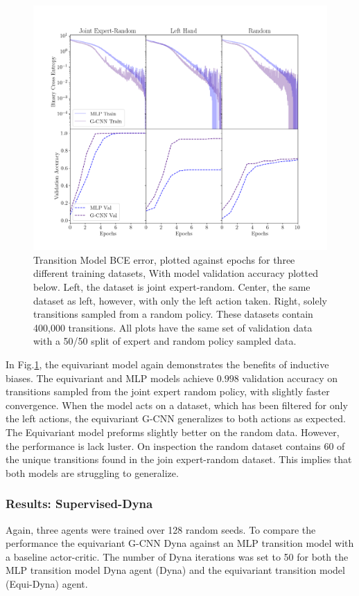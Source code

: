 \begin{figure}
	\centering
	\includegraphics[width=\linewidth]{Figures/transition_model_catch.png}
	\caption{Transition Model BCE error, plotted against epochs for three different training datasets, With model validation accuracy plotted below. Left, the dataset is joint expert-random. Center, the same dataset as left, however, with only the left action taken. Right, solely transitions sampled from a random policy. These datasets contain 400,000 transitions. All plots have the same set of validation data with a 50/50 split of expert and random policy sampled data.}
	\label{fig:tm_catch}
\end{figure}

In Fig.\ref{fig:tm_catch}, the equivariant model again demonstrates the benefits of inductive biases. The equivariant and MLP models achieve $0.998$ validation accuracy on transitions sampled from the joint expert random policy, with slightly faster convergence. When the model acts on a dataset, which has been filtered for only the left actions, the equivariant G-CNN generalizes to both actions as expected. The Equivariant model preforms slightly better on the random data. However, the performance is lack luster. On inspection the random dataset contains $60$ of the unique transitions found in the join expert-random dataset. This implies that both models are struggling to generalize.

\subsubsection{Results: Supervised-Dyna}
Again, three agents were trained over 128 random seeds. To compare the performance the equivariant G-CNN Dyna against an MLP transition model with a baseline actor-critic. The number of Dyna iterations was set to 50 for both the MLP transition model Dyna agent (Dyna) and the equivariant transition model (Equi-Dyna) agent.


